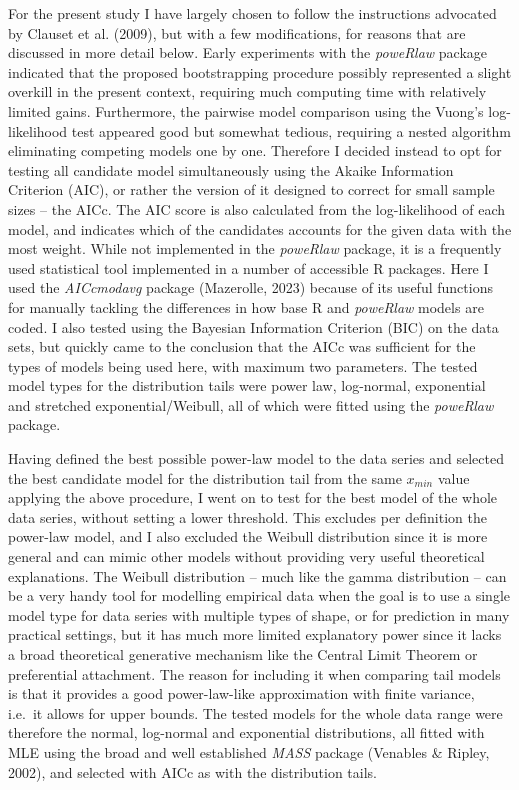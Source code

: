 \documentclass[
  12pt,
]{book}
\begin{document}
For the present study I have largely chosen to follow the instructions advocated by Clauset et al. (2009), but with a few modifications, for reasons that are discussed in more detail below. Early experiments with the \emph{poweRlaw} package indicated that the proposed bootstrapping procedure possibly represented a slight overkill in the present context, requiring much computing time with relatively limited gains. Furthermore, the pairwise model comparison using the Vuong's log-likelihood test appeared good but somewhat tedious, requiring a nested algorithm eliminating competing models one by one. Therefore I decided instead to opt for testing all candidate model simultaneously using the Akaike Information Criterion (AIC), or rather the version of it designed to correct for small sample sizes -- the AICc. The AIC score is also calculated from the log-likelihood of each model, and indicates which of the candidates accounts for the given data with the most weight. While not implemented in the \emph{poweRlaw} package, it is a frequently used statistical tool implemented in a number of accessible R packages. Here I used the \emph{AICcmodavg} package (Mazerolle, 2023) because of its useful functions for manually tackling the differences in how base R and \emph{poweRlaw} models are coded. I also tested using the Bayesian Information Criterion (BIC) on the data sets, but quickly came to the conclusion that the AICc was sufficient for the types of models being used here, with maximum two parameters. The tested model types for the distribution tails were power law, log-normal, exponential and stretched exponential/Weibull, all of which were fitted using the \emph{poweRlaw} package.

Having defined the best possible power-law model to the data series and selected the best candidate model for the distribution tail from the same \(x_{min}\) value applying the above procedure, I went on to test for the best model of the whole data series, without setting a lower threshold. This excludes per definition the power-law model, and I also excluded the Weibull distribution since it is more general and can mimic other models without providing very useful theoretical explanations. The Weibull distribution -- much like the gamma distribution -- can be a very handy tool for modelling empirical data when the goal is to use a single model type for data series with multiple types of shape, or for prediction in many practical settings, but it has much more limited explanatory power since it lacks a broad theoretical generative mechanism like the Central Limit Theorem or preferential attachment. The reason for including it when comparing tail models is that it provides a good power-law-like approximation with finite variance, i.e.~it allows for upper bounds. The tested models for the whole data range were therefore the normal, log-normal and exponential distributions, all fitted with MLE using the broad and well established \emph{MASS} package (Venables \& Ripley, 2002), and selected with AICc as with the distribution tails.
\end{document}
